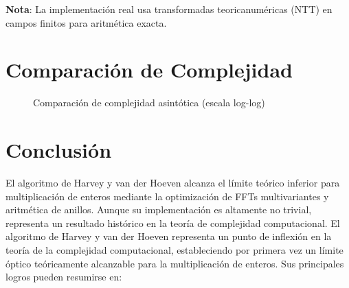 \documentclass{article}
\begin{document}
\textbf{Nota}: La implementación real usa transformadas teoricanuméricas (NTT) en campos finitos para aritmética exacta.

\section{Comparación de Complejidad}
\begin{figure}[h]
\centering
{}
\caption{Comparación de complejidad asintótica (escala log-log)}
\end{figure}

\section{Conclusión}
El algoritmo de Harvey y van der Hoeven alcanza el límite teórico inferior para multiplicación de enteros mediante la optimización de FFTs multivariantes y aritmética de anillos. Aunque su implementación es altamente no trivial, representa un resultado histórico en la teoría de complejidad computacional.
El algoritmo de Harvey y van der Hoeven representa un punto de inflexión en la teoría de la complejidad computacional, estableciendo por primera vez un límite óptico teóricamente alcanzable para la multiplicación de enteros. Sus principales logros pueden resumirse en:
\end{document}
